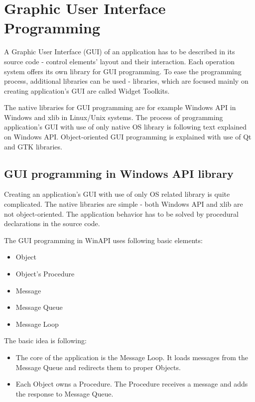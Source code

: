 \chapter{Graphic User Interface Programming}
\vspace{-10mm}

A Graphic User Interface (GUI) of an application has to be described in its source code - control elements' layout and their interaction. Each operation system offers its own library for GUI programming. To ease the programming process, additional libraries can be used - libraries, which are focused mainly on creating application's GUI are called Widget Toolkits.

The native libraries for GUI programming are for example Windows API in Windows and xlib in Linux/Unix systems. The process of programming application's GUI with use of only native OS library is following text explained on Windows API. Object-oriented GUI programming is explained with use of Qt and GTK libraries.

\section{GUI programming in Windows API library}
\label{noqt}
Creating an application's GUI with use of only OS related library is quite complicated. The native libraries are simple - both Windows API and xlib are not object-oriented. The application behavior has to be solved by procedural declarations in the source code.

The GUI programming in WinAPI uses following basic elements\cite[Chapter~2]{eventloopprogramming}:

\begin{itemize}
\item Object
\item Object's Procedure
\item Message
\item Message Queue
\item Message Loop
\end{itemize}

The basic idea is following:

\begin{itemize}
\item The core of the application is the Message Loop. It loads messages from the Message Queue and redirects them to proper Objects.
\item Each Object owns a Procedure. The Procedure receives a message and adds the response to Message Queue.
\end{itemize}

